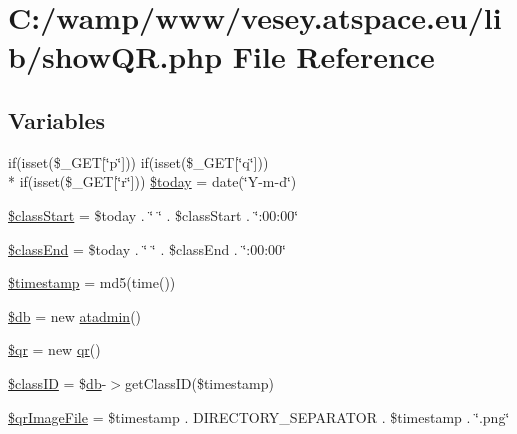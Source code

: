\hypertarget{show_q_r_8php}{\section{C\-:/wamp/www/vesey.atspace.\-eu/lib/show\-Q\-R.php File Reference}
\label{show_q_r_8php}
}
\subsection*{Variables}
\begin{DoxyCompactItemize}
\item 
if(isset(\$\-\_\-\-G\-E\-T\mbox{[}\char`\"{}p\char`\"{}\mbox{]})) if(isset(\$\-\_\-\-G\-E\-T\mbox{[}\char`\"{}q\char`\"{}\mbox{]})) \\*
if(isset(\$\-\_\-\-G\-E\-T\mbox{[}\char`\"{}r\char`\"{}\mbox{]})) \hyperlink{show_q_r_8php_afb731abd6ad83da8867642b5796ca908}{\$today} = date(\char`\"{}Y-\/m-\/d\char`\"{})
\item 
\hyperlink{show_q_r_8php_a8290a94ec873262d279b188952321760}{\$class\-Start} = \$today . \char`\"{} \char`\"{} . \$class\-Start . \char`\"{}\-:00\-:00\char`\"{}
\item 
\hyperlink{show_q_r_8php_a4abed065999cb36b961988a7bf6e48a0}{\$class\-End} = \$today . \char`\"{} \char`\"{} . \$class\-End . \char`\"{}\-:00\-:00\char`\"{}
\item 
\hyperlink{show_q_r_8php_a2b69de9676dd97c675cd4d9bcceb684c}{\$timestamp} = md5(time())
\item 
\hyperlink{show_q_r_8php_a1fa3127fc82f96b1436d871ef02be319}{\$db} = new \hyperlink{classatadmin}{atadmin}()
\item 
\hyperlink{show_q_r_8php_a2357c56e11778cb14e3c86756ae724be}{\$qr} = new \hyperlink{classqr}{qr}()
\item 
\hyperlink{show_q_r_8php_a48ffa401b856e5d2f7f4617bb2a8d580}{\$class\-I\-D} = \$\hyperlink{classdb}{db}-\/$>$get\-Class\-I\-D(\$timestamp)
\item 
\hyperlink{show_q_r_8php_ab1a38d361892b3a36e93a134278a468a}{\$qr\-Image\-File} = \$timestamp . D\-I\-R\-E\-C\-T\-O\-R\-Y\-\_\-\-S\-E\-P\-A\-R\-A\-T\-O\-R . \$timestamp . \char`\"{}.png\char`\"{}
\end{DoxyCompactItemize}


